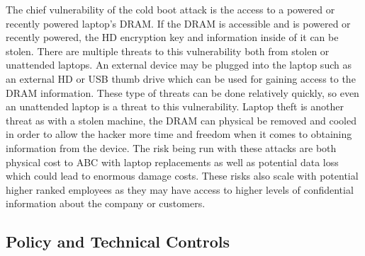 \documentclass[paper=a4, fontsize=11pt]{scrartcl} %
\numberwithin{equation}{section} %
\numberwithin{figure}{section} %
\numberwithin{table}{section} %
\begin{document}
The chief vulnerability of the cold boot attack is the access to a powered
or recently powered laptop's DRAM. If the DRAM is accessible and is powered
or recently powered, the HD encryption key and information inside of it can
be stolen. There are multiple threats to this vulnerability both from stolen
or unattended laptops. An external device may be plugged into the laptop such
as an external HD or USB thumb drive which can be used for gaining access to
the DRAM information. These type of threats can be done relatively quickly, so
even an unattended laptop is a threat to this vulnerability. Laptop theft is
another threat as with a stolen machine, the DRAM can physical be removed and 
cooled in order to allow the hacker more time and freedom when it comes to
obtaining information from the device. The risk being run with these attacks
are both physical cost to ABC with laptop replacements as well as potential
data loss which could lead to enormous damage costs. These risks also scale 
with potential higher ranked employees as they may have access to higher levels
of confidential information about the company or customers. 


\subsection{Policy and Technical Controls}
\end{document}
